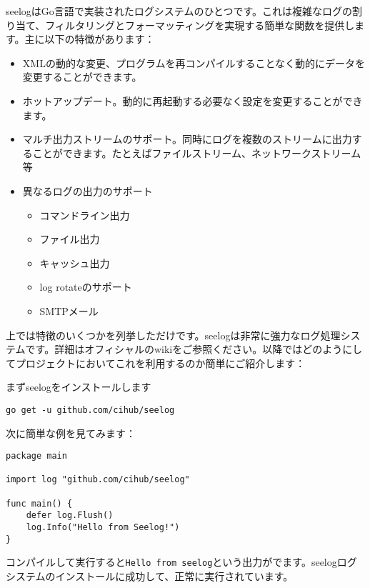 seelogはGo言語で実装されたログシステムのひとつです。これは複雑なログの割り当て、フィルタリングとフォーマッティングを実現する簡単な関数を提供します。主に以下の特徴があります：

\begin{itemize}
  \item XMLの動的な変更、プログラムを再コンパイルすることなく動的にデータを変更することができます。
  \item ホットアップデート。動的に再起動する必要なく設定を変更することができます。
  \item マルチ出力ストリームのサポート。同時にログを複数のストリームに出力することができます。たとえばファイルストリーム、ネットワークストリーム等
  \item 異なるログの出力のサポート
\begin{itemize}
  \item コマンドライン出力
  \item ファイル出力
  \item キャッシュ出力
  \item log rotateのサポート
  \item SMTPメール
\end{itemize}
\end{itemize}
上では特徴のいくつかを列挙しただけです。seelogは非常に強力なログ処理システムです。詳細はオフィシャルのwikiをご参照ください。以降ではどのようにしてプロジェクトにおいてこれを利用するのか簡単にご紹介します：

まずseelogをインストールします

\begin{lstlisting}[numbers=none]
go get -u github.com/cihub/seelog
\end{lstlisting}

次に簡単な例を見てみます：

\begin{lstlisting}[numbers=none]
package main

import log "github.com/cihub/seelog"

func main() {
    defer log.Flush()
    log.Info("Hello from Seelog!")
}
\end{lstlisting}

コンパイルして実行すると\texttt{Hello from seelog}という出力がでます。seelogログシステムのインストールに成功して、正常に実行されています。
